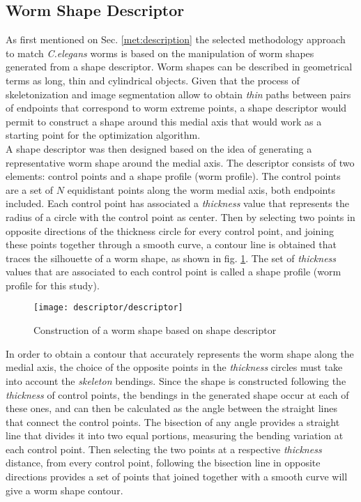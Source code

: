 \subsection{Worm Shape Descriptor}
\label{sec:metshapedescriptor}

As first mentioned on Sec. \ref{met:description} the selected methodology approach 
to match \emph{C.elegans} worms is based on the manipulation of 
worm shapes generated from a shape descriptor.
Worm shapes can be described in geometrical terms as long, thin and cylindrical 
objects. Given that the process of skeletonization and image segmentation allow
to obtain \emph{thin} paths between pairs of endpoints that correspond to worm 
extreme points, a shape descriptor would permit to construct a shape around this
medial axis that would work as a starting point for the optimization algorithm. \\

A shape descriptor was then designed based on the idea of generating a representative
worm shape around the medial axis. The descriptor consists of two 
elements: control points and a shape profile (worm profile). The control points are
a set of $N$ equidistant points along the worm medial axis, both endpoints included.
Each control point has associated a \emph{thickness} value that represents the
radius of a circle with the control point as center. Then by selecting two points
in opposite directions of the thickness circle for every control point, and joining
these points together through a smooth curve, a contour line is obtained that traces
the silhouette of a worm shape, as shown in fig. \ref{fig:descriptor}. 
The set of \emph{thickness} values that are associated to each control point
is called a shape profile (worm profile for this study).

\begin{figure}[h t b p ! H]
 \centering
   \texttt{[image: descriptor/descriptor]}
 \caption{Construction of a worm shape based on shape descriptor}
 \label{fig:descriptor}
\end{figure}

In order to obtain a contour that accurately represents the worm shape along the 
medial axis, the choice of the opposite points in the \emph{thickness} circles 
must take into account the \emph{skeleton} bendings.
Since the shape is constructed following the \emph{thickness} of control points,
the bendings in the generated shape occur at each of these ones, and can then be 
calculated as the angle between the straight lines that connect the control points.
The bisection of any angle provides a straight line that divides it
into two equal portions, measuring the bending variation at each control point.
Then selecting the two points at a respective \emph{thickness} distance, from every control
point, following the bisection line in opposite directions provides a set of points
that joined together with a smooth curve will give a worm shape contour.\\

